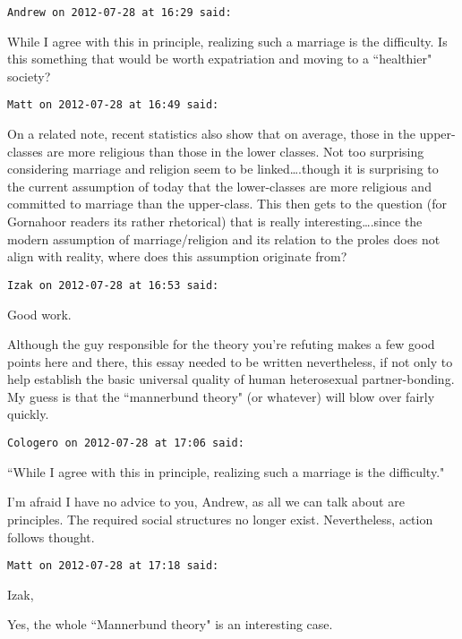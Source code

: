\begin{footnotesize}\begin{sffamily}



\texttt{Andrew on 2012-07-28 at 16:29 said: }

While I agree with this in principle, realizing such a marriage is the difficulty. Is this something that would be worth expatriation and moving to a ``healthier" society?


\hfill

\texttt{Matt on 2012-07-28 at 16:49 said: }

On a related note, recent statistics also show that on average, those in the upper-classes are more religious than those in the lower classes. Not too surprising considering marriage and religion seem to be linked….though it is surprising to the current assumption of today that the lower-classes are more religious and committed to marriage than the upper-class. This then gets to the question (for Gornahoor readers its rather rhetorical) that is really interesting….since the modern assumption of marriage/religion and its relation to the proles does not align with reality, where does this assumption originate from?


\hfill

\texttt{Izak on 2012-07-28 at 16:53 said: }

Good work.

Although the guy responsible for the theory you're refuting makes a few good points here and there, this essay needed to be written nevertheless, if not only to help establish the basic universal quality of human heterosexual partner-bonding. My guess is that the ``mannerbund theory" (or whatever) will blow over fairly quickly.


\hfill

\texttt{Cologero on 2012-07-28 at 17:06 said: }

``While I agree with this in principle, realizing such a marriage is the difficulty."

I'm afraid I have no advice to you, Andrew, as all we can talk about are principles. The required social structures no longer exist. Nevertheless, action follows thought.


\hfill

\texttt{Matt on 2012-07-28 at 17:18 said: }

Izak,

Yes, the whole ``Mannerbund theory" is an interesting case.


\end{sffamily}
\end{footnotesize}

